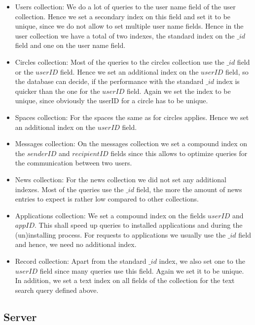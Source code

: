 \begin{itemize}
	\item Users collection: We do a lot of queries to the user name field of the user collection. Hence we set a secondary index on this field and set it to be unique, since we do not allow to set multiple user name fields. Hence in the user collection we have a total of two indexes, the standard index on the $\_id$ field and one on the user name field.
	\item Circles collection: Most of the queries to the circles collection use the $\_id$ field or the $userID$ field. Hence we set an additional index on the $userID$ field, so the database can decide, if the performance with the standard $\_id$ index is quicker than the one for the $userID$ field. Again we set the index to be unique, since obviously the userID for a circle has to be unique.
	\item Spaces collection: For the spaces the same as for circles applies. Hence we set an additional index on the $userID$ field.
	\item Messages collection: On the messages collection we set a compound index on the $senderID$ and $recipientID$ fields since this allows to optimize queries for the communication between two users. 
	\item News collection: For the news collection we did not set any additional indexes. Most of the queries use the $\_id$ field, the more the amount of news entries to expect is rather low compared to other collections.
	\item Applications collection: We set a compound index on the fields $userID$ and $appID$. This shall speed up queries to installed applications and during the (un)installing process. For requests to applications we usually use the $\_id$ field and hence, we need no additional index.
	\item Record collection: Apart from the standard $\_id$ index, we also set one to the $userID$ field since many queries use this field. Again we set it to be unique. In addition, we set a text index on all fields of the collection for the text search query defined above.
\end{itemize}


\subsection{Server}

